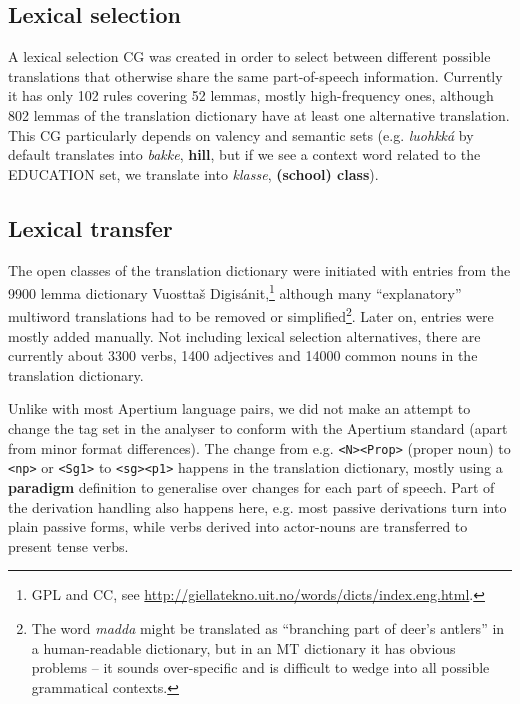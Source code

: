 \documentclass{book}
\begin{document}
\subsection{Lexical selection}
A lexical selection CG was created in order to select between
different possible translations that otherwise share the same
part-of-speech information. Currently it has only 102 rules covering
52 lemmas, mostly high-frequency ones, although 802 lemmas of the
translation dictionary have at least one alternative translation. This
CG particularly depends on valency and semantic sets (e.g.
\textit{luohkká} by default translates into \textit{bakke},
\textbf{hill}, but if we see a context word related to the
\textsc{EDUCATION} set, we translate into \textit{klasse},
\textbf{(school) class}).


\subsection{Lexical transfer}
The open classes of the translation dictionary were initiated with
entries from the 9900 lemma dictionary Vuostta\v{s}
Digis\'{a}nit,\footnote{GPL and CC, see
  \href{http://giellatekno.uit.no/words/dicts/index.eng.html}{http://giellatekno.uit.no/words/dicts/index.eng.html}.}
although many ``explanatory'' multiword translations had to be removed
or simplified\footnote{The word \textit{madda} might be translated as
  ``branching part of deer's antlers'' in a human-readable dictionary,
  but in an MT dictionary it has obvious problems -- it sounds
  over-specific and is difficult to wedge into all possible
  grammatical contexts.}. Later on, entries were mostly added
manually. Not including lexical selection alternatives, there are
currently about 3300 verbs, 1400 adjectives and 14000 common nouns in
the translation dictionary.

Unlike with most Apertium language pairs, we did not make an attempt
to change the tag set in the analyser to conform with the Apertium
standard (apart from minor format differences). The change from e.g.
\texttt{<N><Prop>} (proper noun) to \texttt{<np>} or \texttt{<Sg1>} to
\texttt{<sg><p1>} happens in the translation dictionary, mostly using a
\textbf{paradigm} definition to generalise over changes for each part
of speech. Part of the derivation handling also happens here, e.g. 
most passive derivations turn into plain passive forms, while verbs
derived into actor-nouns are transferred to present tense verbs.
\end{document}

